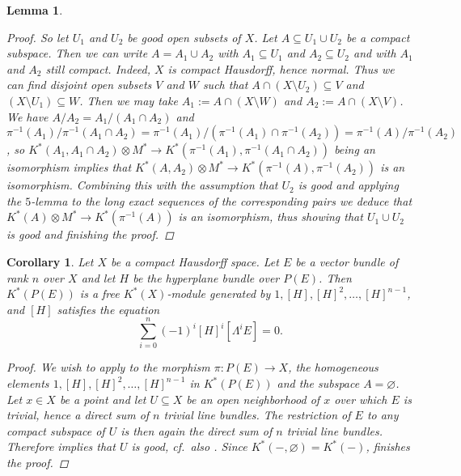 \documentclass[12pt,a4paper]{amsart}
\theoremstyle{plain}
\newtheorem{lm}[thm]{Lemma}
\newtheorem{cor}[thm]{Corollary}
\theoremstyle{definition}
\theoremstyle{remark}
\begin{document}
\begin{lm}
\begin{proof}
    So let $U_{1}$ and $U_{2}$ be good open subsets of $X$.
    Let $A \subseteq U_{1} \cup U_{2}$ be a compact subspace.
    Then we can write $A = A_{1} \cup A_{2}$ with $A_{1} \subseteq U_{1}$ and $A_{2} \subseteq U_{2}$ and with $A_{1}$ and $A_{2}$ still compact.
    Indeed, $X$ is compact Hausdorff, hence normal.
    Thus we can find disjoint open subsets $V$ and $W$ such that $A \cap (X \setminus U_{2}) \subseteq V$ and $(X \setminus U_{1}) \subseteq W$.
    Then we may take $A_{1} := A \cap (X \setminus W)$ and $A_{2} := A \cap (X \setminus V)$.
    We have $A/A_{2} = A_{1}/(A_{1} \cap A_{2})$ and $\pi^{-1}(A_{1})/\pi^{-1}(A_{1} \cap A_{2}) = \pi^{-1}(A_{1})/(\pi^{-1}(A_{1}) \cap \pi^{-1}(A_{2})) = \pi^{-1}(A)/\pi^{-1}(A_{2})$, so $K^{*}(A_{1}, A_{1} \cap A_{2}) \otimes M^{*} \to K^{*}(\pi^{-1}(A_{1}), \pi^{-1}(A_{1} \cap A_{2}))$ being an isomorphism implies that $K^{*}(A, A_{2}) \otimes M^{*} \to K^{*}(\pi^{-1}(A), \pi^{-1}(A_{2}))$ is an isomorphism.
    Combining this with the assumption that $U_{2}$ is good and applying the $5$-lemma to the long exact sequences of the corresponding pairs we deduce that $K^{*}(A) \otimes M^{*} \to K^{*}(\pi^{-1}(A))$ is an isomorphism, thus showing that $U_{1} \cup U_{2}$ is good and finishing the proof.
  \end{proof}
\end{lm}

\begin{cor}\label{cor:generalgraded}
  Let $X$ be a compact Hausdorff space.
  Let $E$ be a vector bundle of rank $n$ over $X$ and let $H$ be the hyperplane bundle over $P(E)$.
  Then $K^{*}(P(E))$ is a free $K^{*}(X)$-module generated by $1, [H], [H]^{2}, \ldots, [H]^{n-1}$, and $[H]$ satisfies the equation
  \[ \sum_{i = 0}^{n} (-1)^{i}[H]^{i}[\Lambda^{i}E] = 0. \]
  \begin{proof}
    We wish to apply  to the morphism $\pi \colon P(E) \to X$, the homogeneous elements $1, [H], [H]^{2}, \ldots, [H]^{n-1}$ in $K^{*}(P(E))$ and the subspace $A = \varnothing$.
    Let $x \in X$ be a point and let $U \subseteq X$ be an open neighborhood of $x$ over which $E$ is trivial, hence a direct sum of $n$ trivial line bundles.
    The restriction of $E$ to any compact subspace of $U$ is then again the direct sum of $n$ trivial line bundles.
    Therefore  implies that $U$ is good, cf.~also .
    Since $K^{*}(-,\varnothing) = K^{*}(-)$,  finishes the proof.
  \end{proof}
\end{cor}
\end{document}
